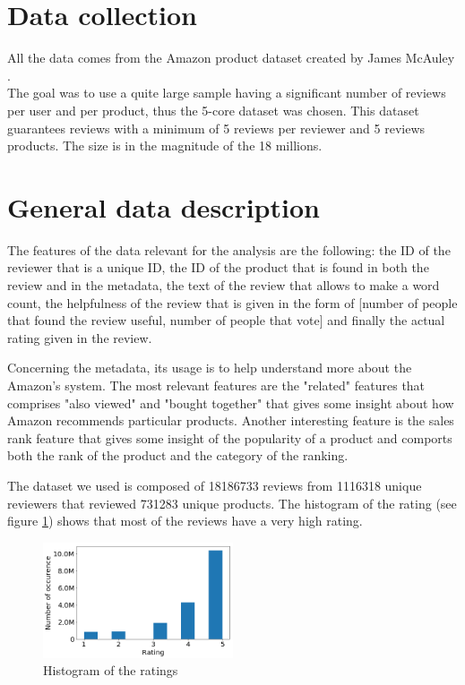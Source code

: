 \documentclass[11pt]{article}
\begin{document}
\section{Data collection}
All the data comes from the Amazon product dataset created by James McAuley \cite{mcauley2015image}.\\
 The goal was to use a quite large sample having a significant number of reviews per user and per product, thus the 5-core dataset was chosen. This dataset guarantees reviews with a minimum of 5 reviews per reviewer and 5 reviews products. The size is in the magnitude of the 18 millions.
\section{General data description}
The features of the data relevant for the analysis are the following: the ID of the reviewer that is a unique ID, the ID of the product that is found in both the review and in the metadata, the text of the review that allows to make a word count, the helpfulness of the review that is given in the form of [number of people that found the review useful, number of people that vote] and finally the actual rating given in the review.\par
 Concerning the metadata, its usage is to help understand more about the Amazon's system. The most relevant features are the "related" features that comprises "also viewed" and "bought together" that gives some insight about how Amazon recommends particular products. Another interesting feature is the sales rank feature that gives some insight of the popularity of a product and comports both the rank of the product and the category of the ranking.

The dataset we used is composed of 18186733 reviews from 1116318 unique reviewers that reviewed 731283 unique products. The histogram of the rating (see figure \ref{rating_hist}) shows that most of the reviews have a very high rating.
\begin{figure}[H]
\includegraphics[width=0.5\textwidth]{rating_hist.png}
\caption{Histogram of the ratings}
\label{rating_hist}
\end{figure}
\end{document}
